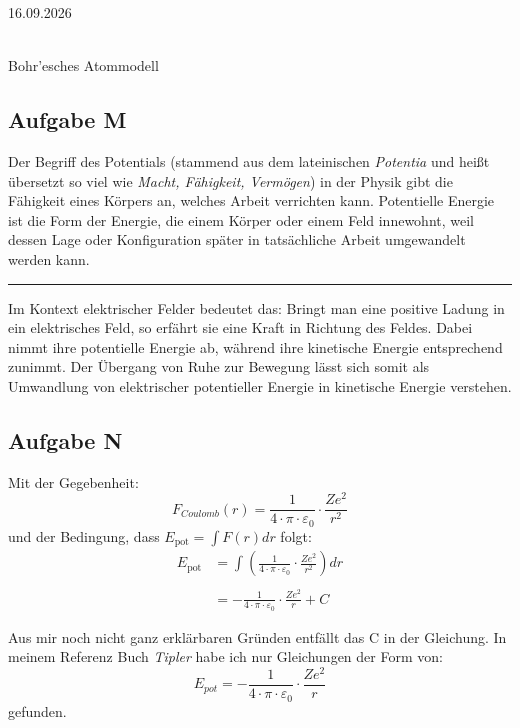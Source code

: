 \documentclass[11pt,a4paper,oneside]{article}
\newcommand{\lessondate}[1]{\noindent\hfill\textcolor{MarginalGray}{\textsc{#1}} \\ \vspace{0.5cm}}
\begin{document}
	\lessondate{16.09.2026}\\
	\begin{loesung}{Bohr'esches Atommodell}
		\subsection*{Aufgabe M}
		Der Begriff des Potentials (stammend aus dem lateinischen \textit{Potentia} und heißt übersetzt so viel wie \textit{Macht, Fähigkeit, Vermögen}) in der Physik gibt die Fähigkeit eines Körpers an, welches Arbeit verrichten kann. Potentielle Energie ist die Form der Energie, die einem Körper oder einem Feld innewohnt, weil dessen Lage oder Konfiguration später in tatsächliche Arbeit umgewandelt werden kann. \\
		\hrule 
		\vspace{5mm}
		Im Kontext elektrischer Felder bedeutet das: Bringt man eine positive Ladung in ein elektrisches Feld, so erfährt sie eine Kraft in Richtung des Feldes. Dabei nimmt ihre potentielle Energie ab, während ihre kinetische Energie entsprechend zunimmt. Der Übergang von Ruhe zur Bewegung lässt sich somit als Umwandlung von elektrischer potentieller Energie in kinetische Energie verstehen.\\
		
		\subsection*{Aufgabe N}
		Mit der Gegebenheit:
		\[
		F_{Coulomb} (r) = \frac{1}{4 \cdot \pi \cdot \varepsilon_0} \cdot \frac{Ze^2}{r^2} 
		\]
		und der Bedingung, dass $E_{\text{pot}} = \int F(r) dr$ folgt: 
		\begin{align*}
			E_{\text{pot}} &= \int \left(\frac{1}{4 \cdot \pi \cdot \varepsilon_0} \cdot \frac{Ze^2}{r^2}\right)dr \\\\
			&= - \frac{1}{4 \cdot \pi \cdot \varepsilon_0} \cdot \frac{Ze^2}{r} + C 
		\end{align*}
		\begin{infobox}
 			Aus mir noch nicht ganz erklärbaren Gründen entfällt das C in der Gleichung. In meinem Referenz Buch \textit{Tipler} habe ich nur Gleichungen der Form von:
 			\[
 			\boxed{E_{pot} = - \frac{1}{4 \cdot \pi \cdot \varepsilon_0} \cdot \frac{Ze^2}{r}}
 			\]
 			gefunden.
		\end{infobox}
	\end{loesung}
	
	\newpage
	
\end{document}

